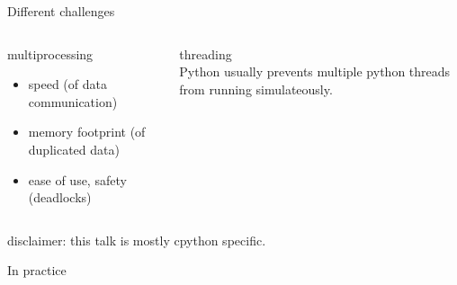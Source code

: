 \documentclass[13pt, usenames,dvipsnames]{beamer} %
\begin{document}
    \begin{frame}[t]{}
        \center
        \vspace{3em}
        \tableofcontents[
            subsectionstyle=show/hide/hide,
            sectionstyle=show/hide
            ]
    \end{frame}
    \begin{frame}[t]{Different challenges}
        \vspace{2cm}
        \begin{columns}
            \begin{column}{0.5\textwidth}
                \small
                multiprocessing
                \begin{itemize}
                    \item speed (of data communication)
                    \item memory footprint (of duplicated data)
                    \item ease of use, safety (deadlocks)
                \end{itemize}
            \end{column}
            \begin{column}{0.5\textwidth}
                \small
                threading\\
                \vspace{1cm}
                Python usually prevents multiple python threads from running
                simulateously.
            \end{column}
        \end{columns}
    \end{frame}
    \begin{frame}[t]{}
        \vspace{5em}
        \center disclaimer: this talk is mostly cpython specific.
    \end{frame}

    \begin{frame}[t]{In practice}
        \begin{figure}[htpb]
            \centering
            \label{seq_vs_parallel_bounds_only}
        \end{figure}
    \end{frame}
\end{document}
